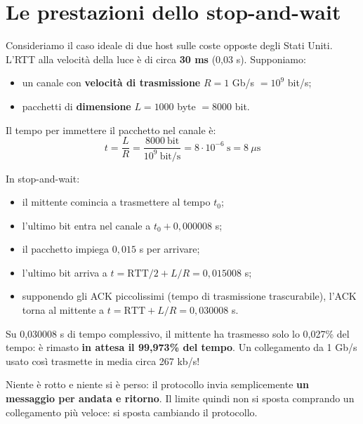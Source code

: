 \section{Le prestazioni dello stop-and-wait}

Consideriamo il caso ideale di due host sulle coste opposte degli Stati Uniti. L'RTT alla velocità della
luce è di circa \textbf{30 ms} (0,03 s). Supponiamo:

\begin{itemize}
    \item un canale con \textbf{velocità di trasmissione} $R = 1$ Gb/s $= 10^9$ bit/s;
    \item pacchetti di \textbf{dimensione} $L = 1000$ byte $= 8000$ bit.
\end{itemize}

Il tempo per immettere il pacchetto nel canale è:
$$t = \frac{L}{R} = \frac{8000\ \text{bit}}{10^9\ \text{bit/s}} = 8\cdot 10^{-6}\ \text{s} = 8\ \mu\text{s}$$

In stop-and-wait:

\begin{itemize}
    \item il mittente comincia a trasmettere al tempo $t_0$;
    \item l'ultimo bit entra nel canale a $t_0 + 0{,}000008$ s;
    \item il pacchetto impiega $0{,}015$ s per arrivare;
    \item l'ultimo bit arriva a $t = \text{RTT}/2 + L/R = 0{,}015008$ s;
    \item supponendo gli ACK piccolissimi (tempo di trasmissione trascurabile), l'ACK torna al mittente a
          $t = \text{RTT} + L/R = 0{,}030008$ s.
\end{itemize}


Su 0,030008 s di tempo complessivo, il mittente ha trasmesso solo lo 0,027\% del tempo: è rimasto
\textbf{in attesa il 99,973\% del tempo}. Un collegamento da 1 Gb/s usato così trasmette in media
circa 267 kb/s!

Niente è rotto e niente si è perso: il protocollo invia semplicemente \textbf{un messaggio per andata e ritorno}. Il
limite quindi non si sposta comprando un collegamento più veloce: si sposta cambiando il protocollo.

